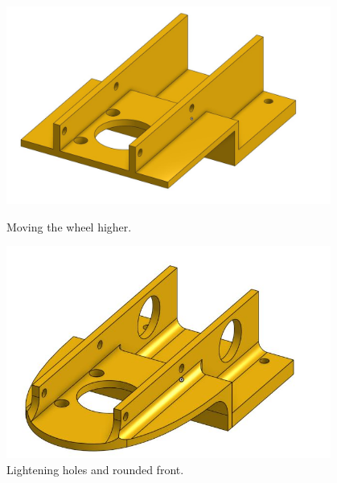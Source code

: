 \begin{figure}[ht]
\centering
\begin{minipage}[b]{.48\textwidth}
  \centering
  \includegraphics[width=0.95\textwidth]{Meetings/October/10-21-21/10-21-21_CAD_Figure1 - Nathan Forrer.JPG}
  \caption{Moving the wheel higher.}
  \label{fig:pic1}
\end{minipage}%
\hfill%
\begin{minipage}[b]{.48\textwidth}
  \centering
  \includegraphics[width=0.95\textwidth]{Meetings/October/10-21-21/10-21-21_CAD_Figure2 - Nathan Forrer.JPG}
  \caption{Lightening holes and rounded front.}
  \label{fig:pic2}
\end{minipage}
\end{figure}


